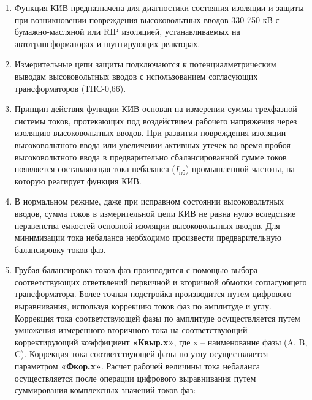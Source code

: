 \color{black}

\begin{enumerate}

\item
Функция КИВ предназначена для диагностики состояния изоляции и защиты при возникновении повреждения высоковольтных вводов 330-750 кВ с бумажно-масляной или RIP изоляцией, устанавливаемых на автотрансформаторах и шунтирующих реакторах.

\item
Измерительные цепи защиты подключаются к потенциалметрическим выводам высоковольтных вводов с использованием согласующих трансформаторов (ТПС-0,66).

\item
Принцип действия функции КИВ основан на измерении суммы трехфазной системы токов, протекающих под воздействием рабочего напряжения через изоляцию высоковольтных вводов. При развитии повреждения изоляции высоковольтного ввода или увеличении активных утечек во время пробоя высоковольтного ввода в предварительно сбалансированной сумме токов появляется составляющая тока небаланса ($I_{\text{нб}}$) промышленной частоты, на которую реагирует функция КИВ.

\item
В нормальном режиме, даже при исправном состоянии высоковольтных вводов, сумма токов в измерительной цепи КИВ не равна нулю вследствие неравенства емкостей основной изоляции высоковольтных вводов. Для минимизации тока небаланса необходимо произвести предварительную балансировку токов фаз.

\item
Грубая балансировка токов фаз производится с помощью выбора соответствующих ответвлений первичной и вторичной обмотки согласующего трансформатора. Более точная подстройка производится путем цифрового выравнивания, используя коррекцию токов фаз по амплитуде и углу. Коррекция тока соответствующей фазы по амплитуде осуществляется путем умножения измеренного вторичного тока на соответствующий корректирующий коэффициент \textbf{«Квыр.x»}, где x – наименование фазы (A, B, C). Коррекция тока соответствующей фазы по углу осуществляется параметром \textbf{«Фкор.x»}. Расчет рабочей величины тока небаланса осуществляется после операции цифрового выравнивания путем суммирования комплексных значений токов фаз:


\end{enumerate}
